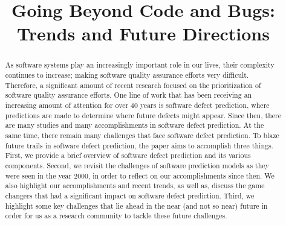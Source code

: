 \documentclass[conference]{IEEEtran}
\begin{document}
\title{Going Beyond Code and Bugs:\\Trends and Future Directions }

\author{
\and
{}
}

\maketitle

\begin{abstract}
As software systems play an increasingly important role in our lives, their complexity continues to increase; making software quality assurance efforts very difficult. Therefore, a significant amount of recent research focused on the prioritization of software quality assurance efforts. One line of work that has been receiving an increasing amount of attention for over 40 years is software defect prediction, where predictions are made to determine where future defects might appear. Since then, there are many studies and many accomplishments in software defect prediction. At the same time, there remain many challenges that face software defect prediction. To blaze future trails in software defect prediction, the paper aims to accomplish three things. First, we provide a brief overview of software defect prediction and its various components. Second, we revisit the challenges of software prediction models as they were seen in the year 2000, in order to reflect on our accomplishments since then. We also highlight our accomplishments and recent trends, as well as, discuss the game changers that had a significant impact on software defect prediction. Third, we highlight some key challenges that lie ahead in the near (and not so near) future in order for us as a research community to tackle these future challenges.



\end{abstract}
\end{document}

